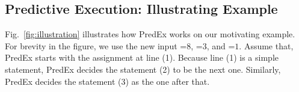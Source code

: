 

\subsection{Predictive Execution: Illustrating Example}
\label{sec:example}




Fig.~\ref{fig:illustration} illustrates how PredEx works on our
motivating example. For brevity in the figure, we use the new input
=$8$, =$3$, and =$1$. Assume that, PredEx
starts with the assignment at line (1). Because line (1) is a simple
statement, PredEx decides the statement (2) to be the next
one. Similarly, PredEx decides the statement (3) as the one after
that.

